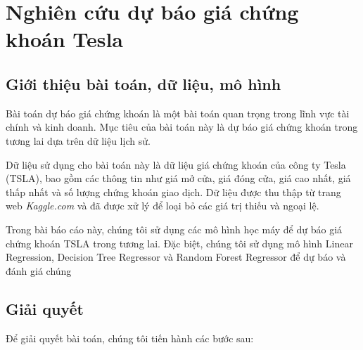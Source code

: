 \documentclass[12pt,a4paper]{article}
\begin{document}
	\section*{Nghiên cứu dự báo giá chứng khoán Tesla}
	
	\subsection{Giới thiệu bài toán, dữ liệu, mô hình}
	Bài toán dự báo giá chứng khoán là một bài toán quan trọng trong lĩnh vực tài chính và kinh doanh. Mục tiêu của bài toán này là dự báo giá chứng khoán trong tương lai dựa trên dữ liệu lịch sử.
	
	Dữ liệu sử dụng cho bài toán này là dữ liệu giá chứng khoán của công ty Tesla (TSLA), bao gồm các thông tin như giá mở cửa, giá đóng cửa, giá cao nhất, giá thấp nhất và số lượng chứng khoán giao dịch. Dữ liệu được thu thập từ trang web \textit{Kaggle.com} và đã được xử lý để loại bỏ các giá trị thiếu và ngoại lệ.
	
	Trong bài báo cáo này, chúng tôi sử dụng các mô hình học máy để dự báo giá chứng khoán TSLA trong tương lai. Đặc biệt, chúng tôi sử dụng mô hình Linear Regression, Decision Tree Regressor và Random Forest Regressor để dự báo và đánh giá chúng \\
	
	\subsection{Giải quyết}
	Để giải quyết bài toán, chúng tôi tiến hành các bước sau:
	
\end{document}
